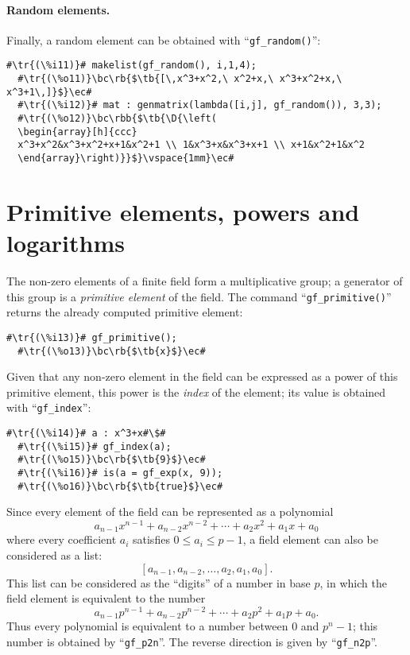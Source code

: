 \documentclass[a4paper,11pt,leqno,fleqn]{artikel3}
\newcommand{\D}{\displaystyle}
\newcommand{\bc}{\begin{center}}
\newcommand{\ec}{\end{center}}
\newcommand{\tr}[1]{\textcolor{red}{#1}}
\newcommand{\tb}[1]{\textcolor{blue}{#1}}
\newcommand{\rb}[1]{\raisebox{2mm}[0mm][1mm]{#1}}
\newcommand{\rbb}[1]{\raisebox{-4mm}[0mm][9mm]{#1}}
\begin{document}
\paragraph{Random elements.}

Finally, a random element can be obtained with ``\verb!gf_random()!'':

\vspace*{2mm}
\begin{lstlisting}[escapechar=\#]
  #\tr{(\%i11)}# makelist(gf_random(), i,1,4);
  #\tr{(\%o11)}\bc\rb{$\tb{[\,x^3+x^2,\ x^2+x,\ x^3+x^2+x,\ x^3+1\,]}$}\ec#
  #\tr{(\%i12)}# mat : genmatrix(lambda([i,j], gf_random()), 3,3);
  #\tr{(\%o12)}\bc\rbb{$\tb{\D{\left(
  \begin{array}[h]{ccc}
  x^3+x^2&x^3+x^2+x+1&x^2+1 \\ 1&x^3+x&x^3+x+1 \\ x+1&x^2+1&x^2
  \end{array}\right)}}$}\vspace{1mm}\ec#
\end{lstlisting}


\section*{Primitive elements, powers and logarithms}

The non-zero elements of a finite field form a multiplicative group; a
generator of this group is a \emph{primitive element} of the field.  The
command ``\verb!gf_primitive()!'' returns the already computed primitive element:

\vspace*{2mm}
\begin{lstlisting}[escapechar=\#]
  #\tr{(\%i13)}# gf_primitive();
  #\tr{(\%o13)}\bc\rb{$\tb{x}$}\ec#
\end{lstlisting}

Given that any non-zero element in the field can be expressed as a power of
this primitive element, this power is the \emph{index} of the element; its
value is obtained with ``\verb!gf_index!'':

\vspace*{2mm}
\begin{lstlisting}[escapechar=\#]
  #\tr{(\%i14)}# a : x^3+x#\$#
  #\tr{(\%i15)}# gf_index(a);
  #\tr{(\%o15)}\bc\rb{$\tb{9}$}\ec#
  #\tr{(\%i16)}# is(a = gf_exp(x, 9));
  #\tr{(\%o16)}\bc\rb{$\tb{true}$}\ec#
\end{lstlisting}

Since every element of the field can be represented as a polynomial
\[
a_{n-1}x^{n-1}+a_{n-2}x^{n-2}+\cdots+a_2x^2+a_1x+a_0
\]
where every coefficient $a_i$ satisfies $0\le a_i\le p-1$, a field element can
also be considered as a list:
\[
[a_{n-1},a_{n-2},\ldots,a_2,a_1,a_0].
\]
This list can be considered as the ``digits'' of a number in base $p$, in
which the field element is equivalent to the number
\[
a_{n-1}p^{n-1}+a_{n-2}p^{n-2}+\cdots+a_2p^2+a_1p+a_0.
\]
Thus every polynomial is equivalent to a number between 0 and $p^n-1$; this
number is obtained by ``\texttt{gf\_p2n}''. 
The reverse direction is given by ``\texttt{gf\_n2p}''.
\end{document}
